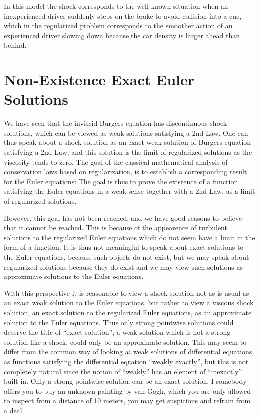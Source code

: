In this model the shock corresponds to the well-known situation 
when an inexperienced driver suddenly steps on the brake to avoid
collision into a cue, which in the regularized problem 
corresponds to the smoother action of an experienced driver
slowing down because the car density is larger
ahead than behind.





\section{Non-Existence Exact Euler Solutions}

We have seen that the inviscid Burgers equation has discontinuous
shock solutions, which can be viewed as weak solutions satisfying
a 2nd Law. One can thus speak about a shock solution as an exact 
weak solution of Burgers equation satisfying a 2nd Law, and 
this solution is the limit of regularized solutions as the 
viscosity tends to zero.
The goal of the classical mathematical analysis of conservation laws
based on regularization, is to establish a corresponding result for
the Euler equations: The goal is thus to prove the existence of a function
satisfying the Euler equations in a weak sense together with a 2nd Law,
as a limit of regularized solutions.

However, this goal has not been reached, and we have good reasons
to believe that it cannot be reached. This is 
because of the appearence of turbulent solutions to the 
regularized Euler equations which do not seem have a limit in the form
of a function. It is thus not meaningful to speak about 
exact solutions to the Euler equations, because such objects do not
exist, but we may speak about regularized solutions because
they do exist and we may view such solutions as approximate
solutions to the Euler equations.

With this perspective it is reasonable to view a shock solution
not as is usual as an exact weak solution to the Euler equations, 
but rather to view a viscous shock solution, an exact solution to the 
regularized Euler equations, as an approximate solution to the 
Euler equations. 
Thus only strong pointwise solutions could deserve the
title of ``exact solution''; a weak solution 
which is not a strong solution like a shock, could only be an approximate 
solution. This may seem to differ from the common way of looking at 
weak solutions of differential equations, as functions satisfying
the differential equation ``weakly exactly'', but this is not completely
natural since the notion of ``weakly'' has an element of ``inexactly''
built in. Only a strong pointwise solution can be an exact solution.
I somebody offers you to buy an unknown painting by
van Gogh,  which you are only allowed to inspect from a distance
of 10 meters, you may get suspicious and refrain from a deal.

